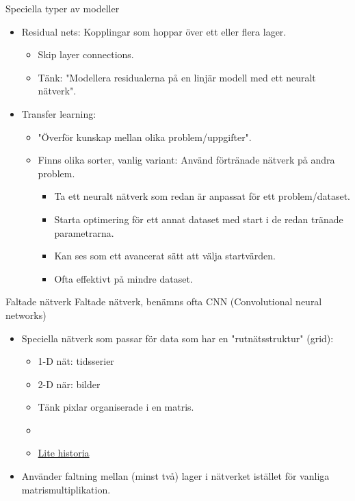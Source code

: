 \documentclass[10pt,english]{beamer}
\begin{document}
\begin{frame}{Speciella typer av modeller}
    \begin{itemize}
        \item Residual nets: Kopplingar som hoppar över ett eller flera lager.
        \begin{itemize}
            \item Skip layer connections.
            \item Tänk: "Modellera residualerna på en linjär modell med ett neuralt nätverk".
        \end{itemize}
        \item Transfer learning:
        \begin{itemize}
            \item "Överför kunskap mellan olika problem/uppgifter".
            \item Finns olika sorter, vanlig variant: Använd förtränade nätverk på andra problem.
            \begin{itemize}
                \item Ta ett neuralt nätverk som redan är anpassat för ett problem/dataset.
                \item Starta optimering för ett annat dataset med start i de redan tränade parametrarna.
                \item Kan ses som ett avancerat sätt att välja startvärden.
                \item Ofta effektivt på mindre dataset.
            \end{itemize}
        \end{itemize}
    \end{itemize}
\end{frame}

\begin{frame}{Faltade nätverk}
    Faltade nätverk, benämns ofta CNN (Convolutional neural networks)
    \begin{itemize}
        \item Speciella nätverk som passar för data som har en "rutnätsstruktur" (grid):
        \begin{itemize}
            \item 1-D nät: tidsserier
            \item 2-D när: bilder
            \item Tänk pixlar organiserade i en matris.
            \item {}
            \item \href{https://dataconomy.com/2017/04/history-neural-networks/}{Lite historia}
        \end{itemize}
        \item Använder faltning mellan (minst två) lager i nätverket istället för vanliga matrismultiplikation.
    \end{itemize}
\end{frame}
\end{document}

